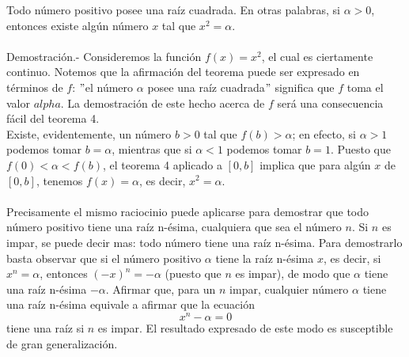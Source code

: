 \begin{teo}
    Todo número positivo posee una raíz cuadrada. En otras palabras, si $\alpha > 0$, entonces existe algún número $x$ tal que $x^2=\alpha$.\\\\
    Demostración.-\; Consideremos la función $f(x)=x^2$, el cual es ciertamente continuo. Notemos que la afirmación del teorema puede ser expresado en términos de $f$: $"$el número $\alpha$ posee una raíz cuadrada$"$ significa que $f$ toma el valor $alpha$. La demostración de este hecho acerca de $f$ será una consecuencia fácil del teorema 4.\\
    Existe, evidentemente, un número $b>0$ tal que $f(b)>\alpha$; en efecto, si $\alpha>1$ podemos tomar $b=\alpha$, mientras que si $\alpha<1$ podemos tomar $b=1$. Puesto que $f(0)<\alpha <f(b)$, el teorema 4 aplicado a $[0,b]$ implica que para algún $x$ de $[0,b]$, tenemos $f(x)=\alpha$, es decir, $x^2=\alpha$.\\\\
    Precisamente el mismo raciocinio puede aplicarse para demostrar que todo número positivo tiene una raíz n-ésima, cualquiera que sea el número $n$. Si $n$ es impar, se puede decir mas: todo número tiene una raíz n-ésima. Para demostrarlo basta observar que si el número positivo $\alpha$ tiene la raíz n-ésima $x$, es decir, si $x^n=\alpha$, entonces $(-x)^n=-\alpha$ (puesto que $n$ es impar), de modo que $\alpha$ tiene una raíz n-ésima $-\alpha$. Afirmar que, para un $n$ impar, cualquier número $\alpha$ tiene una raíz n-ésima equivale a afirmar que la ecuación
    $$x^n - \alpha = 0$$
    tiene una raíz si $n$ es impar. El resultado expresado de este modo es susceptible de gran generalización.\\\\
\end{teo}

